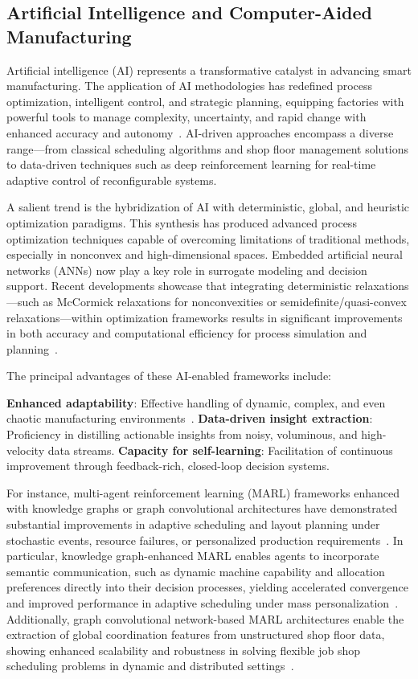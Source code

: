 \documentclass[sigconf]{acmart}
\begin{document}
\subsection{Artificial Intelligence and Computer-Aided Manufacturing}

Artificial intelligence (AI) represents a transformative catalyst in advancing smart manufacturing. The application of AI methodologies has redefined process optimization, intelligent control, and strategic planning, equipping factories with powerful tools to manage complexity, uncertainty, and rapid change with enhanced accuracy and autonomy~\cite{ref2,ref6,ref13,ref14,ref19,ref20,ref27,ref30,ref37,ref38,ref41,ref42,ref44,ref45,ref50,ref52,ref56,ref72,ref91}. AI-driven approaches encompass a diverse range—from classical scheduling algorithms and shop floor management solutions to data-driven techniques such as deep reinforcement learning for real-time adaptive control of reconfigurable systems.

A salient trend is the hybridization of AI with deterministic, global, and heuristic optimization paradigms. This synthesis has produced advanced process optimization techniques capable of overcoming limitations of traditional methods, especially in nonconvex and high-dimensional spaces. Embedded artificial neural networks (ANNs) now play a key role in surrogate modeling and decision support. Recent developments showcase that integrating deterministic relaxations—such as McCormick relaxations for nonconvexities or semidefinite/quasi-convex relaxations—within optimization frameworks results in significant improvements in both accuracy and computational efficiency for process simulation and planning~\cite{ref71,ref72,ref73,ref76,ref78}.

The principal advantages of these AI-enabled frameworks include:

\textbf{Enhanced adaptability}: Effective handling of dynamic, complex, and even chaotic manufacturing environments~\cite{ref13,ref19}. \textbf{Data-driven insight extraction}: Proficiency in distilling actionable insights from noisy, voluminous, and high-velocity data streams. \textbf{Capacity for self-learning}: Facilitation of continuous improvement through feedback-rich, closed-loop decision systems.

For instance, multi-agent reinforcement learning (MARL) frameworks enhanced with knowledge graphs or graph convolutional architectures have demonstrated substantial improvements in adaptive scheduling and layout planning under stochastic events, resource failures, or personalized production requirements~\cite{ref27,ref37}. In particular, knowledge graph-enhanced MARL enables agents to incorporate semantic communication, such as dynamic machine capability and allocation preferences directly into their decision processes, yielding accelerated convergence and improved performance in adaptive scheduling under mass personalization~\cite{ref13}. Additionally, graph convolutional network-based MARL architectures enable the extraction of global coordination features from unstructured shop floor data, showing enhanced scalability and robustness in solving flexible job shop scheduling problems in dynamic and distributed settings~\cite{ref14,ref45}.
\end{document}
